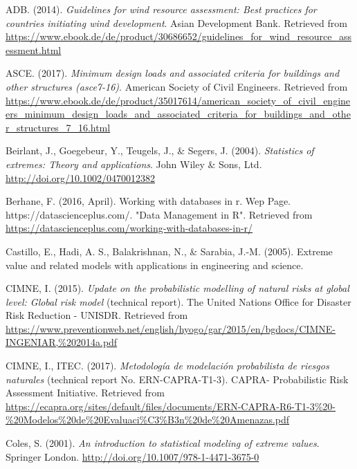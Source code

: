 \documentclass[12pt,twoside]{reedthesis}
\begin{document}

\hypertarget{refs}{}
\leavevmode\hypertarget{ref-windassessment}{}%
ADB. (2014). \emph{Guidelines for wind resource assessment: Best practices for countries initiating wind development}. Asian Development Bank. Retrieved from \url{https://www.ebook.de/de/product/30686652/guidelines_for_wind_resource_assessment.html}

\leavevmode\hypertarget{ref-Asce2017}{}%
ASCE. (2017). \emph{Minimum design loads and associated criteria for buildings and other structures (asce7-16)}. American Society of Civil Engineers. Retrieved from \url{https://www.ebook.de/de/product/35017614/american_society_of_civil_engineers_minimum_design_loads_and_associated_criteria_for_buildings_and_other_structures_7_16.html}

\leavevmode\hypertarget{ref-Beirlant2004}{}%
Beirlant, J., Goegebeur, Y., Teugels, J., \& Segers, J. (2004). \emph{Statistics of extremes: Theory and applications}. John Wiley \& Sons, Ltd. \url{http://doi.org/10.1002/0470012382}

\leavevmode\hypertarget{ref-databasesinr}{}%
Berhane, F. (2016, April). Working with databases in r. Wep Page. https://datascienceplus.com/. "Data Management in R". Retrieved from \url{https://datascienceplus.com/working-with-databases-in-r/}

\leavevmode\hypertarget{ref-Castillo2005}{}%
Castillo, E., Hadi, A. S., Balakrishnan, N., \& Sarabia, J.-M. (2005). Extreme value and related models with applications in engineering and science.

\leavevmode\hypertarget{ref-hurricanemaps}{}%
CIMNE, I. (2015). \emph{Update on the probabilistic modelling of natural risks at global level: Global risk model} (technical report). The United Nations Office for Disaster Risk Reduction - UNISDR. Retrieved from \url{https://www.preventionweb.net/english/hyogo/gar/2015/en/bgdocs/CIMNE-INGENIAR,\%202014a.pdf}

\leavevmode\hypertarget{ref-hurricanemaps2}{}%
CIMNE, I., ITEC. (2017). \emph{Metodología de modelación probabilista de riesgos naturales} (technical report No. ERN-CAPRA-T1-3). CAPRA- Probabilistic Risk Assessment Initiative. Retrieved from \url{https://ecapra.org/sites/default/files/documents/ERN-CAPRA-R6-T1-3\%20-\%20Modelos\%20de\%20Evaluaci\%C3\%B3n\%20de\%20Amenazas.pdf}

\leavevmode\hypertarget{ref-Coles2001}{}%
Coles, S. (2001). \emph{An introduction to statistical modeling of extreme values}. Springer London. \url{http://doi.org/10.1007/978-1-4471-3675-0}
\end{document}
